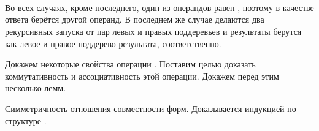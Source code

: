 \begin{code}
\\
\> \AgdaSymbol{(} \AgdaSymbol{\{}\AgdaSymbol{\}} \AgdaSymbol{\{}\AgdaSymbol{\}}  \AgdaSymbol{)}  \AgdaSymbol{(}   \AgdaSymbol{)}\AgdaSymbol{)} \AgdaSymbol{=}     \<%
\\
\>           \AgdaSymbol{(}  \AgdaSymbol{)} \AgdaSymbol{=} \<[53]%
\>[53]\<%
\\
\>[0]\<[2]%
\>[2] \AgdaSymbol{(}  \AgdaSymbol{)}   \AgdaSymbol{(}  \AgdaSymbol{)}  \<%
\end{code}

Во всех случаях, кроме последнего, один из операндов равен
, поэтому в качестве ответа берётся другой
операнд. В последнем же случае делаются два рекурсивных запуска от 
пар левых и правых поддеревьев и результаты берутся как левое и правое
поддерево результата, соответственно.
  
Докажем некоторые свойства операции . Поставим
целью доказать коммутативность и ассоциативность этой операции.
Докажем перед этим несколько лемм.

Симметричность отношения совместности форм. Доказывается индукцией
по структуре   .

\begin{code}%
\> \AgdaSymbol{:}  \AgdaSymbol{\{}  \AgdaSymbol{:} \AgdaSymbol{\}}        \<%
\end{code}

